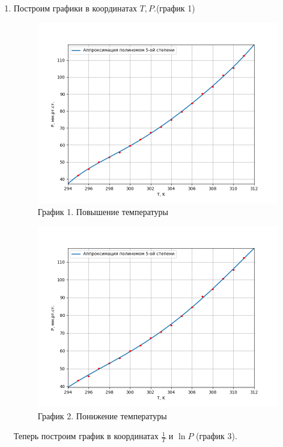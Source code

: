 \documentclass[a4paper,12pt]{article} %
\begin{document}
\begin{enumerate}
	\newpage
	\item Построим графики в координатах $T, P$.(график 1)
	\begin{figure}[h!]
		\centering
		\includegraphics[scale = 0.8]{График 1.png}
		\caption*{График 1. Повышение температуры}
	\end{figure}
	\newpage
	\begin{figure}[h!]
		\centering
		\includegraphics[scale = 0.8]{График 2.png}
		\caption*{График 2. Понижение температуры}
	\end{figure}
	\vspace{15mm}

	Теперь построим график в координатах $\frac{1}{T}$ и $\ln{P}$ (график 3).
	

\end{enumerate}
\end{document}
